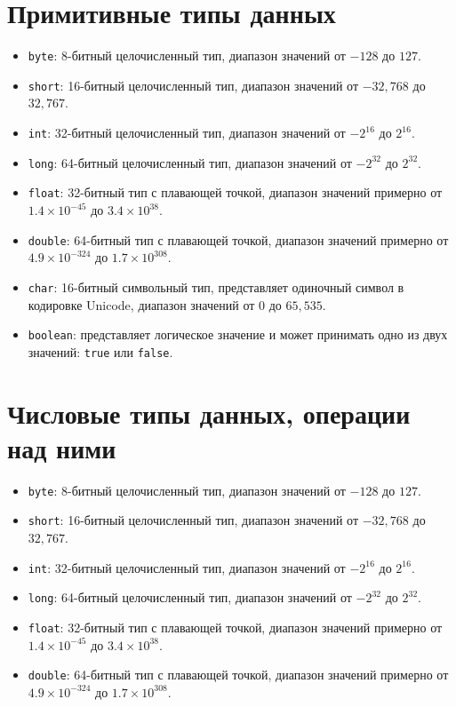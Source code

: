 \documentclass[12pt, a4paper]{article}
\begin{document}
\section{Примитивные типы данных}
\begin{itemize}
    \item \texttt{byte}: 8-битный целочисленный тип, диапазон значений от $-128$ до $127$.
    \item \texttt{short}: 16-битный целочисленный тип, диапазон значений от $-32,768$ до $32,767$.
    \item \texttt{int}: 32-битный целочисленный тип, диапазон значений от $-2^{16}$ до $2^{16}$.
    \item \texttt{long}: 64-битный целочисленный тип, диапазон значений от $-2^{32}$ до $2^{32}$.

    \item \texttt{float}: 32-битный тип с плавающей точкой, диапазон значений примерно от $1.4 \times 10^{-45}$ до $3.4 \times 10^{38}$.
    \item \texttt{double}: 64-битный тип с плавающей точкой, диапазон значений примерно от $4.9 \times 10^{-324}$ до $1.7 \times 10^{308}$.

    \item \texttt{char}: 16-битный символьный тип, представляет одиночный символ в кодировке Unicode, диапазон значений от $0$ до $65,535$.

    \item \texttt{boolean}: представляет логическое значение и может принимать одно из двух значений: \texttt{true} или \texttt{false}.
\end{itemize}


\section{Числовые типы данных, операции над ними}
\begin{itemize}
    \item \texttt{byte}: 8-битный целочисленный тип, диапазон значений от $-128$ до $127$.
    \item \texttt{short}: 16-битный целочисленный тип, диапазон значений от $-32,768$ до $32,767$.
    \item \texttt{int}: 32-битный целочисленный тип, диапазон значений от $-2^{16}$ до $2^{16}$.
    \item \texttt{long}: 64-битный целочисленный тип, диапазон значений от $-2^{32}$ до $2^{32}$.

    \item \texttt{float}: 32-битный тип с плавающей точкой, диапазон значений примерно от $1.4 \times 10^{-45}$ до $3.4 \times 10^{38}$.
    \item \texttt{double}: 64-битный тип с плавающей точкой, диапазон значений примерно от $4.9 \times 10^{-324}$ до $1.7 \times 10^{308}$.
\end{itemize}
\end{document}
